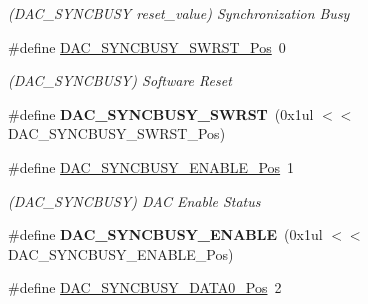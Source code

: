 \begin{DoxyCompactItemize}
\begin{DoxyCompactList}\small\item\em (D\+A\+C\+\_\+\+S\+Y\+N\+C\+B\+U\+S\+Y reset\+\_\+value) Synchronization Busy \end{DoxyCompactList}\item 
\hypertarget{group___s_a_m_l21___d_a_c_ga0ab7aff18f93be96e950be32c7cb04cb}{}\#define \hyperlink{group___s_a_m_l21___d_a_c_ga0ab7aff18f93be96e950be32c7cb04cb}{D\+A\+C\+\_\+\+S\+Y\+N\+C\+B\+U\+S\+Y\+\_\+\+S\+W\+R\+S\+T\+\_\+\+Pos}~0\label{group___s_a_m_l21___d_a_c_ga0ab7aff18f93be96e950be32c7cb04cb}

\begin{DoxyCompactList}\small\item\em (D\+A\+C\+\_\+\+S\+Y\+N\+C\+B\+U\+S\+Y) Software Reset \end{DoxyCompactList}\item 
\hypertarget{group___s_a_m_l21___d_a_c_ga3f95d442bc27b75e9efd372c6d60369b}{}\#define {\bfseries D\+A\+C\+\_\+\+S\+Y\+N\+C\+B\+U\+S\+Y\+\_\+\+S\+W\+R\+S\+T}~(0x1ul $<$$<$ D\+A\+C\+\_\+\+S\+Y\+N\+C\+B\+U\+S\+Y\+\_\+\+S\+W\+R\+S\+T\+\_\+\+Pos)\label{group___s_a_m_l21___d_a_c_ga3f95d442bc27b75e9efd372c6d60369b}

\item 
\hypertarget{group___s_a_m_l21___d_a_c_ga230872861abc95e2225e3f5c4246f141}{}\#define \hyperlink{group___s_a_m_l21___d_a_c_ga230872861abc95e2225e3f5c4246f141}{D\+A\+C\+\_\+\+S\+Y\+N\+C\+B\+U\+S\+Y\+\_\+\+E\+N\+A\+B\+L\+E\+\_\+\+Pos}~1\label{group___s_a_m_l21___d_a_c_ga230872861abc95e2225e3f5c4246f141}

\begin{DoxyCompactList}\small\item\em (D\+A\+C\+\_\+\+S\+Y\+N\+C\+B\+U\+S\+Y) D\+A\+C Enable Status \end{DoxyCompactList}\item 
\hypertarget{group___s_a_m_l21___d_a_c_gaf5026eb13c31f062c9d50389a53e398b}{}\#define {\bfseries D\+A\+C\+\_\+\+S\+Y\+N\+C\+B\+U\+S\+Y\+\_\+\+E\+N\+A\+B\+L\+E}~(0x1ul $<$$<$ D\+A\+C\+\_\+\+S\+Y\+N\+C\+B\+U\+S\+Y\+\_\+\+E\+N\+A\+B\+L\+E\+\_\+\+Pos)\label{group___s_a_m_l21___d_a_c_gaf5026eb13c31f062c9d50389a53e398b}

\item 
\hypertarget{group___s_a_m_l21___d_a_c_ga9f415827b3ff10d6dcff38f9e03d2dd3}{}\#define \hyperlink{group___s_a_m_l21___d_a_c_ga9f415827b3ff10d6dcff38f9e03d2dd3}{D\+A\+C\+\_\+\+S\+Y\+N\+C\+B\+U\+S\+Y\+\_\+\+D\+A\+T\+A0\+\_\+\+Pos}~2\label{group___s_a_m_l21___d_a_c_ga9f415827b3ff10d6dcff38f9e03d2dd3}


\end{DoxyCompactItemize}
